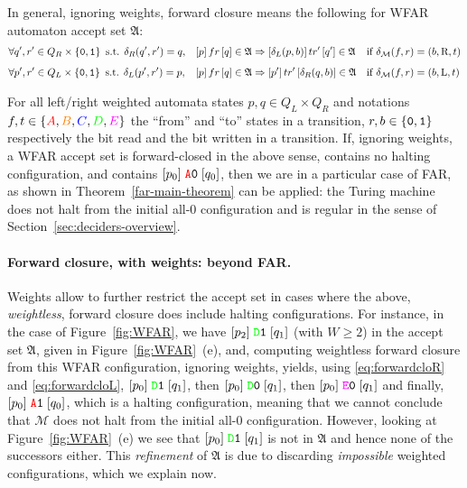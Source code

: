 In general, ignoring weights, forward closure means the following for WFAR automaton accept set $\mathfrak{A}$:
\begin{align}
     & \forall q', r' \in Q_R \times \left\{\texttt{0},\texttt{1}\right\} \text{ s.t. } \delta_R(q', r') = q,
     &                                                                              & [p]\, fr\, [q] \in \mathfrak{A} \Rightarrow [\delta_L(p,b)]\, tr'\, [q'] \in \mathfrak{A}
     &                                                                              & \text{if } \delta_{\mathcal{M}}(f,r) = (b, \text{R}, t) \label{eq:forwardcloR}
    \\[0.5em]
     & \forall p', r' \in Q_L\times \left\{\texttt{0},\texttt{1}\right\} \text{ s.t. } \delta_L(p', r') = p,
     &                                                                              & [p]\, fr\, [q] \in \mathfrak{A} \Rightarrow [p']\, tr'\, [\delta_R(q,b)] \in \mathfrak{A}
     &                                                                              & \text{if } \delta_{\mathcal{M}}(f,r) = (b, \text{L}, t) \label{eq:forwardcloL}
\end{align}

For all left/right weighted automata states $p,q \in Q_L \times Q_R$ and notations $f,t \in \{\stateA,\stateB,\stateC,\stateD,\stateE\}$ the ``from'' and ``to'' states in a transition, $r,b \in \left\{\texttt{0},\texttt{1}\right\}$ respectively the bit read and the bit written in a transition. If, ignoring weights, a WFAR accept set is forward-closed in the above sense, contains no halting configuration, and contains $[p_0] \; \texttt{\stateA}\szero\; [q_0]$, then we are in a particular case of FAR, as shown in \cite{bbchallenge_part1} \ie Theorem~\ref{far-main-theorem} can be applied: the Turing machine does not halt from the initial all-0 configuration and is regular in the sense of Section~\ref{sec:deciders-overview}.

\paragraph{Forward closure, with weights: beyond FAR.} Weights allow to further restrict the accept set in cases where the above, \textit{weightless}, forward closure does include halting configurations. For instance, in the case of Figure~\ref{fig:WFAR}, we have $[p_2] \; \texttt{\stateD}\sone \; [q_1]$ (with $W \geq 2$) in the accept set $\mathfrak{A}$, given in Figure~\ref{fig:WFAR}~(e), and, computing weightless forward closure from this WFAR configuration, ignoring weights, yields, using \eqref{eq:forwardcloR} and \eqref{eq:forwardcloL}, $[p_0] \; \texttt{\stateD}\sone \; [q_1]$, then $[p_0] \; \texttt{\stateD}\szero \; [q_1]$, then $[p_0] \; \texttt{\stateE}\szero \; [q_1]$ and finally, $[p_0] \; \texttt{\stateA}\sone \; [q_0] $, which is a halting configuration, meaning that we cannot conclude that $\mathcal{M}$ does not halt from the initial all-0 configuration. However, looking at Figure~\ref{fig:WFAR}~(e) we see that $[p_0] \; \texttt{\stateD}\sone \; [q_1]$ is not in $\mathfrak{A}$ and hence none of the successors either. This \textit{refinement} of $\mathfrak{A}$ is due to discarding \textit{impossible} weighted configurations, which we explain now.

